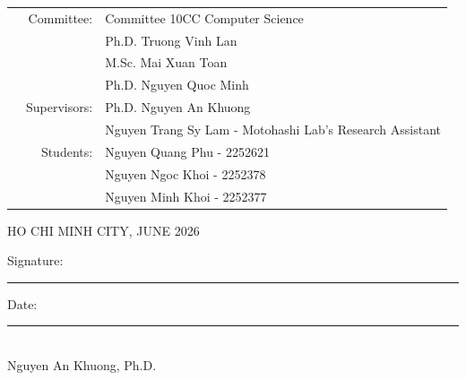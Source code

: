 \documentclass[openany]{mitthesis}
\theoremstyle{definition}
\begin{document}
\begin{titlepage}
\vspace{0.1cm}

\begin{table}[H]
\begin{tabular}{rrl}

\hspace{4 cm} & Committee: & Committee 10CC Computer Science \\
& & Ph.D. Truong Vinh Lan \\
& & M.Sc. Mai Xuan Toan \\
& & Ph.D. Nguyen Quoc Minh \\[0.3cm]
& Supervisors: & Ph.D. Nguyen An Khuong \\
& & Nguyen Trang Sy Lam - Motohashi Lab's Research Assistant \\[0.3cm]
& Students: & Nguyen Quang Phu - 2252621 \\
& & Nguyen Ngoc Khoi - 2252378 \\
& & Nguyen Minh Khoi - 2252377 \\
\end{tabular}
\end{table}

\vfill
\begin{center}
{\footnotesize HO CHI MINH CITY, JUNE 2026}
\end{center}
\restoregeometry
\end{titlepage}


\pgfplotsset{compat=1.18}


\newpage
\noindent Signature: \rule{0.5\textwidth}{0.4pt} \hfill Date: \rule{0.25\textwidth}{0.4pt}\\[1em]
\noindent\phantom{Signature: }Nguyen An Khuong, Ph.D.
\newpage




\clearpage
\tableofcontents
\listoffigures
\listoftables

\clearpage
{}
\setcounter{page}{1}









\cleardoublepage
{}
{}
\printbibliography[title={References}]
\cleardoublepage

\cleardoublepage
{}
{}
\begin{appendices}

\end{appendices}

\end{document}
